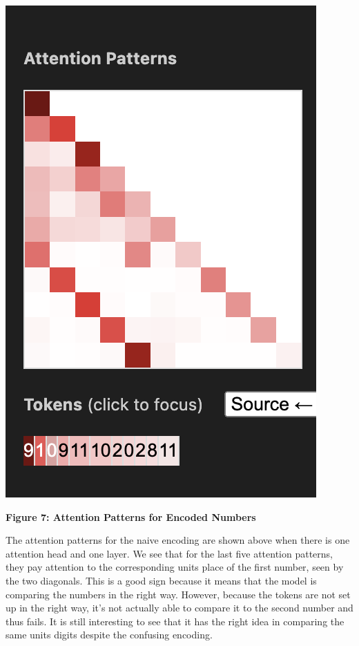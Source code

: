 \documentclass{article}
\begin{document}
\begin{center}
    \includegraphics[scale=0.4]{images/att_encoding3.png}

    \textbf{Figure 7: Attention Patterns for Encoded Numbers}
\end{center}

The attention patterns for the naive encoding are shown above when there is one attention head and one layer. We see that for the last five attention patterns, they pay attention to the corresponding units place of the first number, seen by the two diagonals. This is a good sign because it means that the model is comparing the numbers in the right way. However, because the tokens are not set up in the right way, it's not actually able to compare it to the second number and thus fails. It is still interesting to see that it has the right idea in comparing the same units digits despite the confusing encoding.
\end{document}
